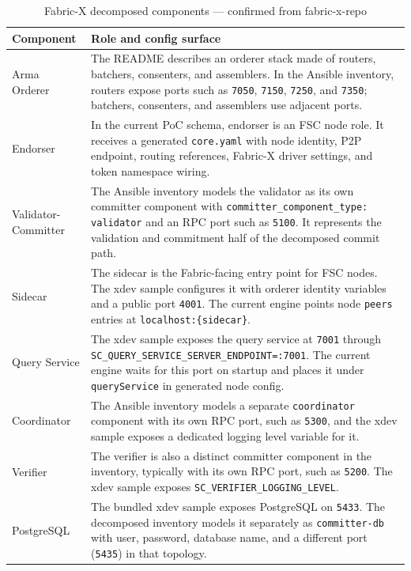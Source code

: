 \begin{table}[h]
\centering
\begin{tabularx}{\textwidth}{|l|X|}
\hline
\textbf{Component} & \textbf{Role and config surface} \\
\hline
Arma Orderer & The README describes an orderer stack made of routers, batchers, consenters, and assemblers. In the Ansible inventory, routers expose ports such as \texttt{7050}, \texttt{7150}, \texttt{7250}, and \texttt{7350}; batchers, consenters, and assemblers use adjacent ports. \\
\hline
Endorser & In the current PoC schema, endorser is an FSC node role. It receives a generated \texttt{core.yaml} with node identity, P2P endpoint, routing references, Fabric-X driver settings, and token namespace wiring. \\
\hline
Validator-Committer & The Ansible inventory models the validator as its own committer component with \texttt{committer\_component\_type: validator} and an RPC port such as \texttt{5100}. It represents the validation and commitment half of the decomposed commit path. \\
\hline
Sidecar & The sidecar is the Fabric-facing entry point for FSC nodes. The xdev sample configures it with orderer identity variables and a public port \texttt{4001}. The current engine points node \texttt{peers} entries at \texttt{localhost:\{sidecar\}}. \\
\hline
Query Service & The xdev sample exposes the query service at \texttt{7001} through \texttt{SC\_QUERY\_SERVICE\_SERVER\_ENDPOINT=:7001}. The current engine waits for this port on startup and places it under \texttt{queryService} in generated node config. \\
\hline
Coordinator & The Ansible inventory models a separate \texttt{coordinator} component with its own RPC port, such as \texttt{5300}, and the xdev sample exposes a dedicated logging level variable for it. \\
\hline
Verifier & The verifier is also a distinct committer component in the inventory, typically with its own RPC port, such as \texttt{5200}. The xdev sample exposes \texttt{SC\_VERIFIER\_LOGGING\_LEVEL}. \\
\hline
PostgreSQL & The bundled xdev sample exposes PostgreSQL on \texttt{5433}. The decomposed inventory models it separately as \texttt{committer-db} with user, password, database name, and a different port (\texttt{5435}) in that topology. \\
\hline
\end{tabularx}
\caption{Fabric-X decomposed components --- confirmed from fabric-x-repo}
\label{tab:fabricx-components}
\end{table}

